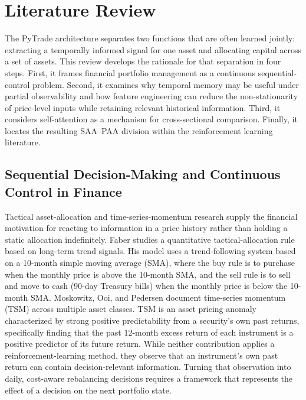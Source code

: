 \section{Literature Review}

The PyTrade architecture separates two functions that are often learned jointly: extracting a temporally informed signal for one asset and allocating capital across a set of assets. This review develops the rationale for that separation in four steps. First, it frames financial portfolio management as a continuous sequential-control problem. Second, it examines why temporal memory may be useful under partial observability and how feature engineering can reduce the non-stationarity of price-level inputs while retaining relevant historical information. Third, it considers self-attention as a mechanism for cross-sectional comparison. Finally, it locates the resulting SAA--PAA division within the reinforcement learning literature.

\subsection{Sequential Decision-Making and Continuous Control in Finance}

Tactical asset-allocation and time-series-momentum research supply the financial motivation for reacting to information in a price history rather than holding a static allocation indefinitely. Faber \cite{Faber2007} studies a quantitative tactical-allocation rule based on long-term trend signals. His model uses a trend-following system based on a 10-month simple moving average (SMA), where the buy rule is to purchase when the monthly price is above the 10-month SMA, and the sell rule is to sell and move to cash (90-day Treasury bills) when the monthly price is below the 10-month SMA. Moskowitz, Ooi, and Pedersen \cite{Moskowitz2012} document time-series momentum (TSM) across multiple asset classes. TSM is an asset pricing anomaly characterized by strong positive predictability from a security's own past returns, specifically finding that the past 12-month excess return of each instrument is a positive predictor of its future return. While neither contribution applies a reinforcement-learning method, they observe that an instrument's own past return can contain decision-relevant information. Turning that observation into daily, cost-aware rebalancing decisions requires a framework that represents the effect of a decision on the next portfolio state.

